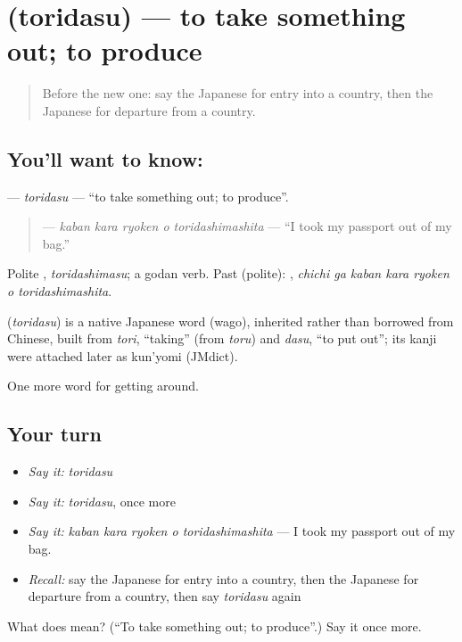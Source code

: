 \section[\texorpdfstring{\ja{とりだす} (toridasu)}{とりだす (toridasu)}]{ (toridasu) — to take something out; to produce}

\label{lesson:JA-C386-toridasu}



\begin{quote}
Before the new one: say the Japanese for entry into a country, then the Japanese for departure from a country.
\end{quote}

\subsection*{You'll want to know: }
\textbf{} — \emph{toridasu} — \textquotedblleft{}to take something out; to produce\textquotedblright{}.

\begin{quote}
\textbf{  } — \emph{kaban kara ryoken o toridashimashita} — \textquotedblleft{}I took my passport out of my bag.\textquotedblright{}
\end{quote}

Polite \textbf{}, \emph{toridashimasu}; a godan verb. Past (polite): \textbf{   }, \emph{chichi ga kaban kara ryoken o toridashimashita}.

\begin{cousinweb}
\textbf{} (\emph{toridasu}) is a native Japanese word (wago), inherited rather than borrowed from Chinese, built from \emph{tori}, \textquotedblleft{}taking\textquotedblright{} (from \emph{toru}) and \emph{dasu}, \textquotedblleft{}to put out\textquotedblright{}; its kanji were attached later as kun'yomi (JMdict).
\end{cousinweb}

\begin{grammarlens}[title={What you've built}]
One more word for getting around.
\end{grammarlens}

\subsection*{Your turn}
\begin{itemize}
\raggedright
  \item \emph{Say it:} \emph{toridasu}
  \item \emph{Say it:} \emph{toridasu}, once more
  \item \emph{Say it:} \emph{kaban kara ryoken o toridashimashita} — I took my passport out of my bag.
  \item \emph{Recall:} say the Japanese for entry into a country, then the Japanese for departure from a country, then say \emph{toridasu} again
\end{itemize}

\begin{tcolorbox}[breakable,colback=teal!4,colframe=teal!35!black,title={Before you move on}]
What does  mean? (\textquotedblleft{}To take something out; to produce\textquotedblright{}.) Say it once more.
\end{tcolorbox}
